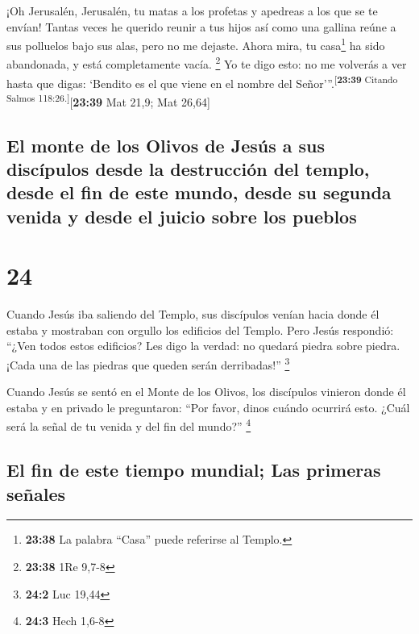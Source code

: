  ¡Oh Jerusalén, Jerusalén, tu matas a los profetas y
apedreas a los que se te envían! Tantas veces he querido reunir a tus
hijos así como una gallina reúne a sus polluelos bajo sus alas, pero no
me dejaste.  Ahora mira, tu casa\footnote{\textbf{23:38}
  La palabra ``Casa'' puede referirse al Templo.} ha sido abandonada, y
está completamente vacía. \footnote{\textbf{23:38} 1Re 9,7-8}
 Yo te digo esto: no me volverás a ver hasta que digas:
`Bendito es el que viene en el nombre del
Señor'''.\textsuperscript{{[}\textbf{23:39} Citando Salmos
118:26.{]}}{[}\textbf{23:39} Mat 21,9; Mat 26,64{]}

\hypertarget{el-monte-de-los-olivos-de-jesuxfas-a-sus-discuxedpulos-desde-la-destrucciuxf3n-del-templo-desde-el-fin-de-este-mundo-desde-su-segunda-venida-y-desde-el-juicio-sobre-los-pueblos}{%
\subsection{El monte de los Olivos de Jesús a sus discípulos desde la
destrucción del templo, desde el fin de este mundo, desde su segunda
venida y desde el juicio sobre los
pueblos}\label{el-monte-de-los-olivos-de-jesuxfas-a-sus-discuxedpulos-desde-la-destrucciuxf3n-del-templo-desde-el-fin-de-este-mundo-desde-su-segunda-venida-y-desde-el-juicio-sobre-los-pueblos}}

\hypertarget{section-23}{%
\section{24}\label{section-23}}

 Cuando Jesús iba saliendo del Templo, sus discípulos
venían hacia donde él estaba y mostraban con orgullo los edificios del
Templo.  Pero Jesús respondió: ``¿Ven todos estos
edificios? Les digo la verdad: no quedará piedra sobre piedra. ¡Cada una
de las piedras que queden serán derribadas!'' \footnote{\textbf{24:2}
  Luc 19,44}

 Cuando Jesús se sentó en el Monte de los Olivos, los
discípulos vinieron donde él estaba y en privado le preguntaron: ``Por
favor, dinos cuándo ocurrirá esto. ¿Cuál será la señal de tu venida y
del fin del mundo?'' \footnote{\textbf{24:3} Hech 1,6-8}

\hypertarget{el-fin-de-este-tiempo-mundial-las-primeras-seuxf1ales}{%
\subsection{El fin de este tiempo mundial; Las primeras
señales}\label{el-fin-de-este-tiempo-mundial-las-primeras-seuxf1ales}}

